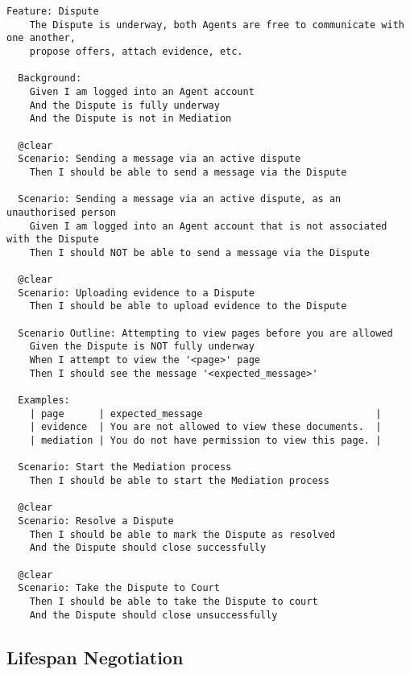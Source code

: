 \begin{lstlisting}
Feature: Dispute
    The Dispute is underway, both Agents are free to communicate with one another,
    propose offers, attach evidence, etc.

  Background:
    Given I am logged into an Agent account
    And the Dispute is fully underway
    And the Dispute is not in Mediation

  @clear
  Scenario: Sending a message via an active dispute
    Then I should be able to send a message via the Dispute

  Scenario: Sending a message via an active dispute, as an unauthorised person
    Given I am logged into an Agent account that is not associated with the Dispute
    Then I should NOT be able to send a message via the Dispute

  @clear
  Scenario: Uploading evidence to a Dispute
    Then I should be able to upload evidence to the Dispute

  Scenario Outline: Attempting to view pages before you are allowed
    Given the Dispute is NOT fully underway
    When I attempt to view the '<page>' page
    Then I should see the message '<expected_message>'

  Examples:
    | page      | expected_message                              |
    | evidence  | You are not allowed to view these documents.  |
    | mediation | You do not have permission to view this page. |

  Scenario: Start the Mediation process
    Then I should be able to start the Mediation process

  @clear
  Scenario: Resolve a Dispute
    Then I should be able to mark the Dispute as resolved
    And the Dispute should close successfully

  @clear
  Scenario: Take the Dispute to Court
    Then I should be able to take the Dispute to court
    And the Dispute should close unsuccessfully

\end{lstlisting}

\subsection{Lifespan Negotiation}

